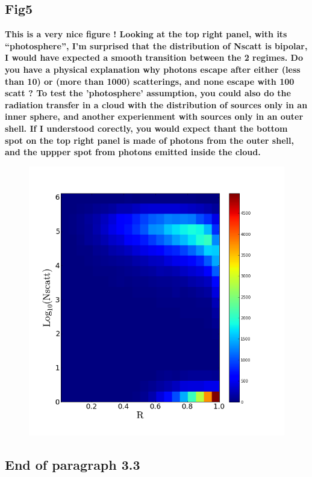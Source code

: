 \documentclass[12pt]{article}
\begin{document}
\subsection*{Fig5}

{\bf This is a very nice figure ! Looking at the top right panel, with
  its “photosphere”, I’m surprised that the distribution of Nscatt is
  bipolar, I would have expected a smooth transition between the 2
  regimes. Do you have a physical explanation why photons escape after
  either (less than 10) or (more than 1000) scatterings, and none
  escape with 100 scatt ? To test the ’photosphere’ assumption, you
  could also do the radiation transfer in a cloud with the
  distribution of sources only in an inner sphere, and another
  experienment with sources only in an outer shell. If I understood
  corectly, you would expect thant the bottom spot on the top right
  panel is made of photons from the outer shell, and the uppper spot
  from photons emitted inside the cloud.} 

\begin{figure}
  \includegraphics[scale=0.4]{Histogram2dNscattVSRadius.png}
\end{figure}


\subsection*{End of paragraph 3.3}
\end{document}
